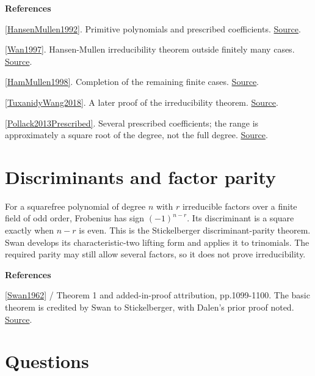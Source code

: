 \documentclass[11pt,a4paper,oneside,openany]{book}
\newenvironment{sources}{\par\smallskip\begingroup\footnotesize\color{atlasgray}\leftskip=10pt\setlength{\parskip}{2pt}}{\par\endgroup\smallskip}
\begin{document}
\begin{sources}
\textbf{References}\par\smallskip
\noindent\hyperlink{ref:HansenMullen1992}{[HansenMullen1992]}. Primitive polynomials and prescribed coefficients. \href{https://doi.org/10.1090/S0025-5718-1992-1134730-7}{Source}.\par
\noindent\hyperlink{ref:Wan1997}{[Wan1997]}. Hansen-Mullen irreducibility theorem outside finitely many cases. \href{https://doi.org/10.1090/S0025-5718-97-00835-1}{Source}.\par
\noindent\hyperlink{ref:HamMullen1998}{[HamMullen1998]}. Completion of the remaining finite cases. \href{https://doi.org/10.1090/S0025-5718-98-00904-1}{Source}.\par
\noindent\hyperlink{ref:TuxanidyWang2018}{[TuxanidyWang2018]}. A later proof of the irreducibility theorem. \href{https://arxiv.org/abs/1604.04023}{Source}.\par
\noindent\hyperlink{ref:Pollack2013Prescribed}{[Pollack2013Prescribed]}. Several prescribed coefficients; the range is approximately a square root of the degree, not the full degree. \href{https://www.pollack-math.net/prescribed.pdf}{Source}.\par
\end{sources}\color{black}
\section{Discriminants and factor parity}
\color{black} For a squarefree polynomial of degree \(n\) with \(r\) irreducible factors over a finite field of odd order, Frobenius has sign \((-1)^{n-r}\). Its discriminant is a square exactly when \(n-r\) is even. This is the Stickelberger discriminant-parity theorem. Swan develops its characteristic-two lifting form and applies it to trinomials. The required parity may still allow several factors, so it does not prove irreducibility.\par
\begin{sources}
\textbf{References}\par\smallskip
\noindent\hyperlink{ref:Swan1962}{[Swan1962]} / Theorem 1 and added-in-proof attribution, pp.1099-1100. The basic theorem is credited by Swan to Stickelberger, with Dalen's prior proof noted. \href{https://msp.org/pjm/1962/12-3/pjm-v12-n3-p27-p.pdf}{Source}.\par
\end{sources}\color{black}
\section*{Questions}
\end{document}
